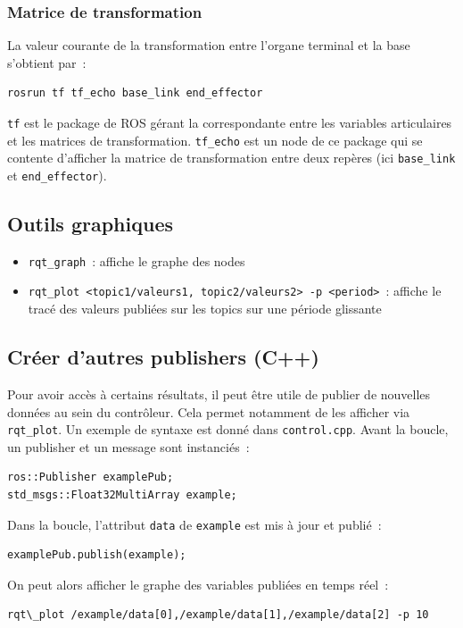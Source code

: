 \documentclass[12pt,a4paper]{article}
\begin{document}
\subsubsection*{Matrice de transformation}

La valeur courante de la transformation entre l'organe terminal et la base s'obtient par~: 
\begin{verbatim}
rosrun tf tf_echo base_link end_effector
\end{verbatim}
\texttt{tf} est le package de ROS gérant la correspondante entre les variables articulaires et les matrices de transformation. 
\texttt{tf\_echo} est un node de ce package qui se contente d'afficher la matrice de transformation entre deux repères (ici \texttt{base\_link} et \texttt{end\_effector}).


\subsection{Outils graphiques}
\begin{itemize}
\item \texttt{rqt\_graph}~: affiche le graphe des nodes
\item \texttt{rqt\_plot <topic1/valeurs1, topic2/valeurs2> -p <period>}~: affiche le tracé des valeurs publiées sur les topics sur une période glissante
\end{itemize}

\subsection{Créer d'autres publishers (C++)}\label{sec:publish}
Pour avoir accès à certains résultats, il peut être utile de publier de nouvelles données au sein du contrôleur. Cela permet notamment de les afficher via \texttt{rqt\_plot}.
Un exemple de syntaxe est donné dans \texttt{control.cpp}. Avant la boucle, un publisher et un message sont instanciés~:
\begin{verbatim}
ros::Publisher examplePub;
std_msgs::Float32MultiArray example;
\end{verbatim}Dans la boucle, l'attribut \texttt{data} de \texttt{example} est mis à jour et publié~:
\begin{verbatim}
examplePub.publish(example);
\end{verbatim}On peut alors afficher le graphe des variables publiées en temps réel~:
\begin{verbatim}
rqt\_plot /example/data[0],/example/data[1],/example/data[2] -p 10
\end{verbatim}
\end{document}
